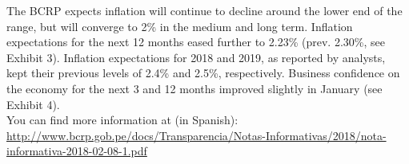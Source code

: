 \documentclass[final,a4paper]{report}
\begin{document}
\begin{minipage}{0.58\textwidth}
{The BCRP expects inflation will continue to decline around the lower end of the range, but will converge to 2\% in the medium and long term. Inflation expectations for the next 12 months eased further to 2.23\% (prev. 2.30\%, see Exhibit 3). Inflation expectations for 2018 and 2019, as reported by analysts, kept their previous levels of 2.4\% and 2.5\%, respectively. Business confidence on the economy for the next 3 and 12 months improved slightly in January (see Exhibit 4).\\

You can find more information at (in Spanish):\\
\href{http://www.bcrp.gob.pe/docs/Transparencia/Notas-Informativas/2018/nota-informativa-2018-02-08-1.pdf}{http://www.bcrp.gob.pe/docs/Transparencia/Notas-Informativas/2018/nota-informativa-2018-02-08-1.pdf}
}
	\end{minipage} %
\end{document}
